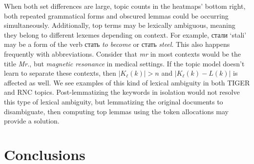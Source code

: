 \documentclass[11pt,a4paper]{article}
\begin{document}
When both set differences are large, topic counts in the heatmaps' bottom right, both repeated grammatical forms and obscured lemmas could be occurring simultaneously. Additionally, top terms may be lexically ambiguous, meaning they belong to different lexemes depending on context. For example, \foreignlanguage{russian}{стали} `stali' may be a form of the verb \foreignlanguage{russian}{стать} \textit{to become} or \foreignlanguage{russian}{стать} \textit{steel}. This also happens frequently with abbreviations. Consider that \textit{mr} in most contexts would be the title \textit{Mr.}, but \textit{magnetic resonance} in medical settings. If the topic model doesn't learn to separate these contexts, then $|K_\ell(k)| > n$ and $|K_\ell(k) - L(k)|$ is affected as well. We see examples of this kind of lexical ambiguity in both TIGER and RNC topics. Post-lemmatizing the keywords in isolation would not resolve this type of lexical ambiguity, but lemmatizing the original documents to disambiguate, then computing top lemmas using the token allocations may provide a solution.


\section{Conclusions}


\end{document}
